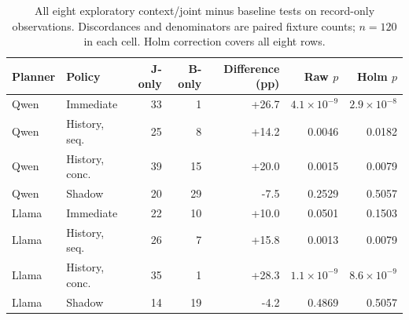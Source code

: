 \begin{table}[t]\centering\footnotesize
\caption{All eight exploratory context/joint minus baseline tests on record-only observations. Discordances and denominators are paired fixture counts; $n=120$ in each cell. Holm correction covers all eight rows.}\label{tab:supp-record-tests}
\setlength{\tabcolsep}{3pt}
\begin{tabularx}{\textwidth}{@{}llrrrrr@{}}\toprule
Planner & Policy & J-only & B-only & Difference (pp) & Raw $p$ & Holm $p$ \\\midrule
Qwen & Immediate & 33 & 1 & +26.7 & $4.1\!\times\!10^{-9}$ & $2.9\!\times\!10^{-8}$ \\
Qwen & History, seq. & 25 & 8 & +14.2 & 0.0046 & 0.0182 \\
Qwen & History, conc. & 39 & 15 & +20.0 & 0.0015 & 0.0079 \\
Qwen & Shadow & 20 & 29 & -7.5 & 0.2529 & 0.5057 \\
Llama & Immediate & 22 & 10 & +10.0 & 0.0501 & 0.1503 \\
Llama & History, seq. & 26 & 7 & +15.8 & 0.0013 & 0.0079 \\
Llama & History, conc. & 35 & 1 & +28.3 & $1.1\!\times\!10^{-9}$ & $8.6\!\times\!10^{-9}$ \\
Llama & Shadow & 14 & 19 & -4.2 & 0.4869 & 0.5057 \\
\bottomrule\end{tabularx}\end{table}
